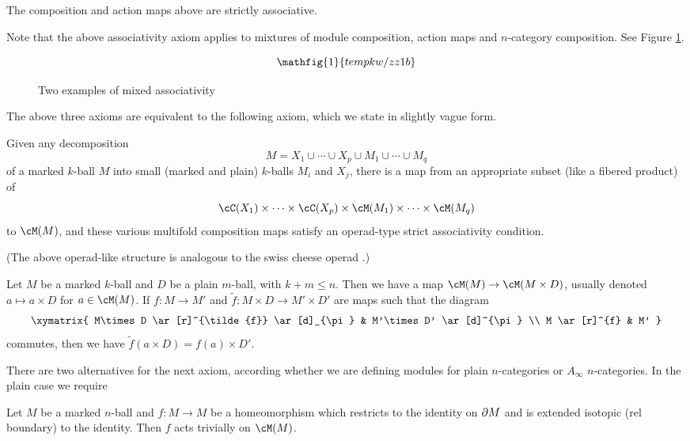 {The composition and action maps above are strictly associative.}

Note that the above associativity axiom applies to mixtures of module composition,
action maps and $n$-category composition.
See Figure \ref{zzz1b}.

\begin{figure}[!ht]
\begin{equation*}
\mathfig{1}{tempkw/zz1b}
\end{equation*}
\caption{Two examples of mixed associativity}
\label{zzz1b}
\end{figure}


The above three axioms are equivalent to the following axiom,
which we state in slightly vague form.

{Given any decomposition 
\[
	M =  X_1 \cup\cdots\cup X_p \cup M_1\cup\cdots\cup M_q
\]
of a marked $k$-ball $M$
into small (marked and plain) $k$-balls $M_i$ and $X_j$, there is a 
map from an appropriate subset (like a fibered product) 
of 
\[
	\cC(X_1)\times\cdots\times\cC(X_p) \times \cM(M_1)\times\cdots\times\cM(M_q) 
\]
to $\cM(M)$,
and these various multifold composition maps satisfy an
operad-type strict associativity condition.}

(The above operad-like structure is analogous to the swiss cheese operad
\cite{MR1718089}.)

{Let $M$ be a marked $k$-ball and $D$ be a plain $m$-ball, with $k+m \le n$.
Then we have a map $\cM(M)\to \cM(M\times D)$, usually denoted $a\mapsto a\times D$ for $a\in \cM(M)$.
If $f:M\to M'$ and $\tilde{f}:M\times D \to M'\times D'$ are maps such that the diagram
\[ \xymatrix{
	M\times D \ar[r]^{\tilde{f}} \ar[d]_{\pi} & M'\times D' \ar[d]^{\pi} \\
	M \ar[r]^{f} & M'
} \]
commutes, then we have $\tilde{f}(a\times D) = f(a)\times D'$.}



There are two alternatives for the next axiom, according whether we are defining
modules for plain $n$-categories or $A_\infty$ $n$-categories.
In the plain case we require

{Let $M$ be a marked $n$-ball and $f: M\to M$ be a homeomorphism which restricts
to the identity on $\partial M$ and is extended isotopic (rel boundary) to the identity.
Then $f$ acts trivially on $\cM(M)$.}

